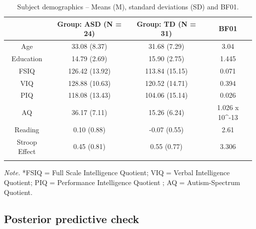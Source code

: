 \documentclass[
  11pt,
  english,
  ,doc,floatsintext]{apa6}
\begin{document}
\begin{table}[htb]

\begin{center}
\begin{threeparttable}

\caption{\label{tab:demoWO}Subject demographics – Means (M), standard deviations (SD) and BF01.}

\begin{tabular}{cccc}
\toprule
 & \multicolumn{1}{c}{Group: ASD (N = 24)} & \multicolumn{1}{c}{Group: TD (N = 31)} & \multicolumn{1}{c}{BF01}\\
\midrule
Age & 33.08 (8.37) & 31.68 (7.29) & 3.04\\
Education & 14.79 (2.69) & 15.90 (2.75) & 1.445\\
FSIQ & 126.42 (13.92) & 113.84 (15.15) & 0.071\\
VIQ & 128.88 (10.63) & 120.52 (14.71) & 0.394\\
PIQ & 118.08 (13.43) & 104.06 (15.14) & 0.026\\
AQ & 36.17 (7.11) & 15.26 (6.24) & 1.026 x 10\textasciicircum{}-13\\
Reading & 0.10 (0.88) & -0.07 (0.55) & 2.61\\
Stroop Effect & 0.45 (0.81) & 0.55 (0.77) & 3.306\\
\bottomrule
\addlinespace
\end{tabular}

\begin{tablenotes}[para]
\normalsize{\textit{Note.} *FSIQ = Full Scale Intelligence Quotient; VIQ = Verbal Intelligence Quotient; PIQ = Performance Intelligence Quotient ; AQ = Autism-Spectrum Quotient.}
\end{tablenotes}

\end{threeparttable}
\end{center}

\end{table}

\hypertarget{posterior-predictive-check}{%
\subsection{Posterior predictive check}\label{posterior-predictive-check}}
\end{document}
